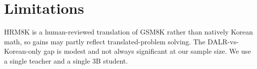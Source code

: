 \documentclass[11pt]{article}
\begin{document}
\section*{Limitations}
HRM8K is a human-reviewed translation of GSM8K rather than natively
Korean math, so gains may partly reflect translated-problem solving.
The DALR-vs-Korean-only gap is modest and not always significant at our
sample size. We use a single teacher and a single 3B student.



\end{document}
